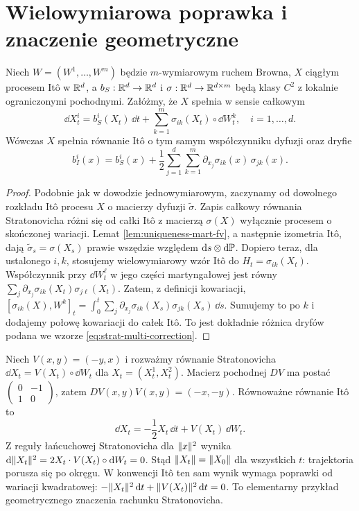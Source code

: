 \section{Wielowymiarowa poprawka i znaczenie geometryczne}
\begin{twierdzenie}
Niech $W=(W^1,\ldots,W^m)$ będzie $m$-wymiarowym
ruchem Browna, $X$ ciągłym procesem Itô w $\mathbb{R}^d$,
a $b_S:\mathbb{R}^d\to\mathbb{R}^d$ i
$\sigma:\mathbb{R}^d\to\mathbb{R}^{d\times m}$ będą klasy $C^2$
z lokalnie ograniczonymi pochodnymi.
Załóżmy, że $X$ spełnia w sensie całkowym
\[
\dd X_t^i=b_S^i(X_t)\,\dd t
+\sum_{k=1}^m\sigma_{ik}(X_t)\circ\dd W_t^k,
\quad i=1,\ldots,d.
\]
Wówczas $X$ spełnia równanie Itô o tym samym
współczynniku dyfuzji oraz dryfie
\[
b_I^i(x)=b_S^i(x)+\frac12\sum_{j=1}^d
\sum_{k=1}^m\partial_{x_j}\sigma_{ik}(x)\,
\sigma_{jk}(x).
\tag{4.10}\label{eq:strat-multi-correction}
\]
\end{twierdzenie}
\begin{proof}
Podobnie jak w dowodzie jednowymiarowym, zaczynamy
od dowolnego rozkładu Itô procesu $X$ o macierzy
dyfuzji $\widetilde\sigma$. Zapis całkowy równania
Stratonovicha różni się od całki Itô z macierzą
$\sigma(X)$ wyłącznie procesem o skończonej wariacji.
Lemat \ref{lem:uniqueness-mart-fv}, a następnie izometria
Itô, dają $\widetilde\sigma_s=\sigma(X_s)$ prawie
wszędzie względem $\mathrm{d} s\otimes\mathrm{d}\mathbb{P}$.
Dopiero teraz, dla ustalonego $i,k$, stosujemy
wielowymiarowy wzór Itô do $H_t=\sigma_{ik}(X_t)$.
Współczynnik przy $\dd W_t^\ell$ w jego części
martyngałowej jest równy
$\sum_j\partial_{x_j}\sigma_{ik}(X_t)\sigma_{j\ell}(X_t)$.
Zatem, z definicji kowariacji,
$[\sigma_{ik}(X),W^k]_t=
\int_0^t\sum_j\partial_{x_j}\sigma_{ik}(X_s)
\sigma_{jk}(X_s)\,\dd s$.
Sumujemy to po $k$ i dodajemy połowę kowariacji do
całek Itô. To jest dokładnie różnica dryfów podana
we wzorze \eqref{eq:strat-multi-correction}.
\end{proof}

\begin{przyklad}
Niech $V(x,y)=(-y,x)$ i rozważmy równanie
Stratonovicha $\dd X_t=V(X_t)\circ\dd W_t$
dla $X_t=(X_t^1,X_t^2)$. Macierz pochodnej $DV$
ma postać $\left(\begin{smallmatrix}0&-1\\1&0\end{smallmatrix}\right)$,
zatem $DV(x,y)V(x,y)=(-x,-y)$.
Równoważne równanie Itô to
\[
\dd X_t=-\frac12X_t\,\dd t+V(X_t)\,\dd W_t.
\]
Z reguły łańcuchowej Stratonovicha dla $\lVert x\rVert^2$
wynika $\mathrm{d}\lVert X_t\rVert^2=2X_t\cdot V(X_t)\circ\mathrm{d} W_t=0$.
Stąd $\lVert X_t\rVert=\lVert X_0\rVert$ dla wszystkich $t$:
trajektoria porusza się po okręgu. W konwencji Itô
ten sam wynik wymaga poprawki od wariacji kwadratowej:
$-\lVert X_t\rVert^2\,\mathrm{d} t+\lVert V(X_t)\rVert^2\,\mathrm{d} t=0$.
To elementarny przykład geometrycznego znaczenia
rachunku Stratonovicha.
\end{przyklad}

